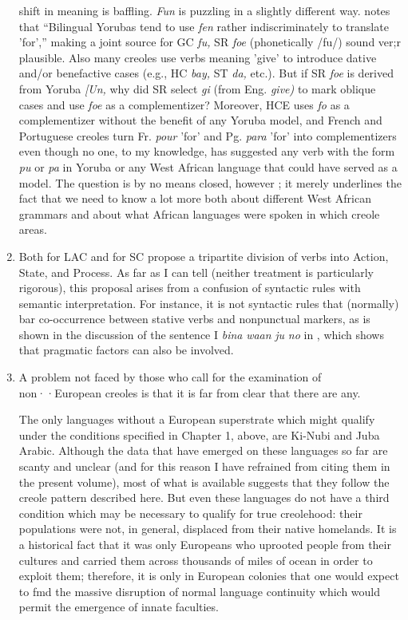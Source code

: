 \begin{enumerate}
shift in meaning is baffling. \textit{Fun} is puzzling in a slightly different way. \citet{Rowlands1969} notes that ``Bilingual Yorubas tend to use \textit{fen} rather indiscriminately to translate 'for','' making a joint source for GC \textit{fu,} SR \textit{foe }(phonetically /fu/) sound ver;r plausible. Also many creoles use
verbs meaning 'give' to introduce dative and/or benefactive cases (e.g., HC \textit{bay,} ST \textit{da,} etc.). But if SR \textit{foe} is derived from Yoruba \textit{[Un,} why did SR select \textit{gi} (from Eng. \textit{give}\textit{)} to mark oblique cases and use \textit{foe} as a complementizer? Moreover, HCE uses \textit{fo} as a complementizer without the benefit of any Yoruba model, and French and Portuguese creoles turn Fr. \textit{pour} 'for' and Pg. \textit{para} 'for' into complementizers even though no one, to my knowledge, has suggested any verb with the form \textit{pu} or \textit{pa} in Yoruba or any West African language that could have served as a model. The question is by no means closed, however ; it merely underlines the fact that we need to know a lot more both about different West African grammars and about what African lan\-guages were spoken in which creole areas. 
\item Both \citet{Christie1976} for LAC and \citet{Corne1981} for SC propose a tripartite division of verbs into Action, State, and Process. As far as I can tell (neither treatment is particularly rigorous), this proposal arises from a confusion of syntactic rules with semantic interpretation. For instance, it is not syntactic rules that (normally) 
bar co-occurrence between stative verbs and nonpunctual markers, as is shown in the discussion of the sentence I \textit{bina} \textit{waan} \textit{ju} \textit{no} in \citet[38]{Bickerton1975}, which shows that pragmatic factors can also be involved.
\item A problem not faced by those who call for the examination of non··European creoles is that it is far from clear that there are any.

The only languages without a European superstrate which might qualify under the conditions specified in Chapter 1, above, are Ki-Nubi and Juba Arabic. Although the data that have emerged on these lan\-guages so far are scanty and unclear (and for this reason I have refrained from citing them in the present volume), most of what is available suggests that they follow the creole pattern described here. But even these languages do not have a third condition which may be necessary to qualify for true creolehood: their populations were not, in general, displaced from their native homelands. It is a historical fact that it was only Europeans who uprooted people from their cultures and carried them across thousands of miles of ocean in order to exploit them;
therefore, it is only in European colonies that one would expect to fmd the massive disruption of normal language continuity which would permit the emergence of innate faculties.


\end{enumerate}
